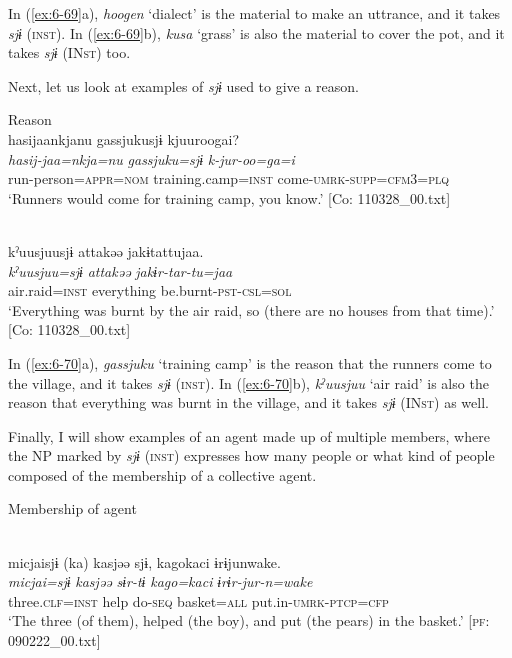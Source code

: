 In (\ref{ex:6-69}a), \textit{hoogen} ‘dialect’ is the material to make an uttrance, and it takes \textit{sjɨ} (\textsc{inst}). In (\ref{ex:6-69}b), \textit{kusa} ‘grass’ is also the material to cover the pot, and it takes \textit{sjɨ} (IN\textsc{st}) too.

Next, let us look at examples of \textit{sjɨ} used to give a reason.

\ea\label{ex:6-70}
  Reason
 \ea{}\\
{\TM}
\glll  hasijaankjanu  {\textbar}gassjuku{\textbar}sjɨ  kjuuroogai?\\
\textit{hasij-jaa=nkja=nu}  \textit{gassjuku=sjɨ}  \textit{k-jur-oo=ga=i}\\
run-person=\textsc{appr}=\textsc{nom}  training.camp=\textsc{inst}  come-\textsc{umrk}-\textsc{supp}=\textsc{cfm}3=\textsc{plq}\\
\glt ‘Runners would come for training camp, you know.’ [Co: 110328\_00.txt]

\ex{}\\
{\TM}
\glll  kˀuusjuusjɨ  attakəə  jakɨtattujaa.\\
\textit{kˀuusjuu=sjɨ}  \textit{attakəə}  \textit{jakɨr-tar-tu=jaa}\\
air.raid=\textsc{inst}  everything  be.burnt-\textsc{pst}-\textsc{csl}=\textsc{sol}\\
\glt ‘Everything was burnt by the air raid, so (there are no houses from that time).’ [Co: 110328\_00.txt]
\z
\z

In (\ref{ex:6-70}a), \textit{gassjuku} ‘training camp’ is the reason that the runners come to the village, and it takes \textit{sjɨ} (\textsc{inst}). In (\ref{ex:6-70}b), \textit{kˀuusjuu} ‘air raid’ is also the reason that everything was burnt in the village, and it takes \textit{sjɨ} (IN\textsc{st}) as well.

Finally, I will show examples of an agent made up of multiple members, where the NP marked by \textit{sjɨ} (\textsc{inst}) expresses how many people or what kind of people composed of the membership of a collective agent.

\ea\label{ex:6-71}
  Membership of agent

 \ea{}\\
{\TM}
\glll  micjaisjɨ  (ka)  kasjəə  sjɨ,  kagokaci   ɨrɨjunwake.\\
\textit{micjai=sjɨ}    \textit{kasjəə}  \textit{sɨr-tɨ}  \textit{kago=kaci}   \textit{ɨrɨr-jur-n=wake}\\
three.\textsc{clf}=\textsc{inst}    help  do-\textsc{seq}  basket=\textsc{all}  put.in-\textsc{umrk}-\textsc{ptcp}=\textsc{cfp}\\
\glt ‘The three (of them), helped (the boy), and put (the pears) in the basket.’ [\textsc{pf}: 090222\_00.txt]

